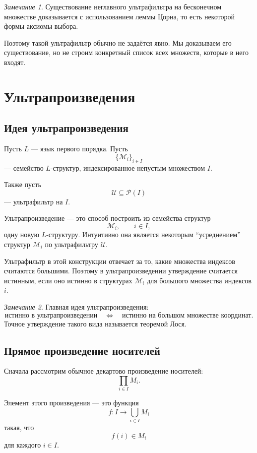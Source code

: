 \documentclass[12pt,a4paper,oneside,openany]{book}
\theoremstyle{definition}
\theoremstyle{plain}
\theoremstyle{remark}
\newtheorem{remark}{Замечание}[chapter]
\begin{document}
\begin{remark}
Существование неглавного ультрафильтра на бесконечном множестве доказывается с использованием леммы Цорна, то есть некоторой формы аксиомы выбора.

Поэтому такой ультрафильтр обычно не задаётся явно. Мы доказываем его существование, но не строим конкретный список всех множеств, которые в него входят.
\end{remark}

\section{Ультрапроизведения}

\subsection{Идея ультрапроизведения}

Пусть $L$ — язык первого порядка. Пусть
\[
\{\mathcal M_i\}_{i\in I}
\]
— семейство $L$-структур, индексированное непустым множеством $I$.

Также пусть
\[
\mathcal U\subseteq\mathcal P(I)
\]
— ультрафильтр на $I$.

Ультрапроизведение — это способ построить из семейства структур
\[
\mathcal M_i,\qquad i\in I,
\]
одну новую $L$-структуру. Интуитивно она является некоторым ``усреднением'' структур $\mathcal M_i$ по ультрафильтру $\mathcal U$.

Ультрафильтр в этой конструкции отвечает за то, какие множества индексов считаются большими. Поэтому в ультрапроизведении утверждение считается истинным, если оно истинно в структурах $\mathcal M_i$ для большого множества индексов $i$.

\begin{remark}
Главная идея ультрапроизведения:
\[
\text{истинно в ультрапроизведении}
\quad
\Longleftrightarrow
\quad
\text{истинно на большом множестве координат}.
\]
Точное утверждение такого вида называется теоремой Лося.
\end{remark}

\subsection{Прямое произведение носителей}

Сначала рассмотрим обычное декартово произведение носителей:
\[
\prod_{i\in I} M_i.
\]

Элемент этого произведения — это функция
\[
f:I\to \bigcup_{i\in I}M_i
\]
такая, что
\[
f(i)\in M_i
\]
для каждого $i\in I$.
\end{document}
